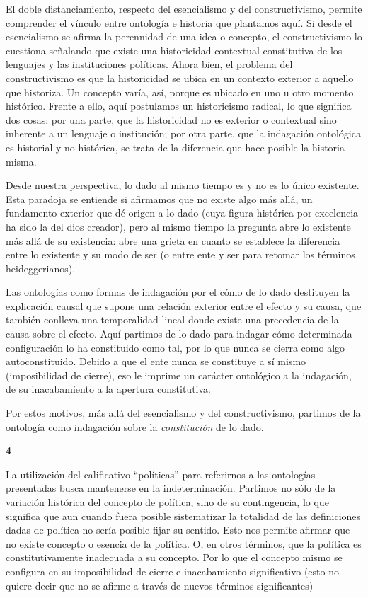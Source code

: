 El doble distanciamiento, respecto del esencialismo y del constructivismo, permite comprender el vínculo entre ontología e historia que plantamos aquí. Si desde el esencialismo se afirma la perennidad de una idea o concepto, el constructivismo lo cuestiona señalando que existe una historicidad contextual constitutiva de los lenguajes y las instituciones políticas. Ahora bien, el problema del constructivismo es que la historicidad se ubica en un contexto exterior a aquello que historiza. Un concepto varía, así, porque es ubicado en uno u otro momento histórico. Frente a ello, aquí postulamos un historicismo radical, lo que significa dos cosas: por una parte, que la historicidad no es exterior o contextual sino inherente a un lenguaje o institución; por otra parte, que la indagación ontológica es historial y no histórica, se trata de la diferencia que hace posible la historia misma.

Desde nuestra perspectiva, lo dado al mismo tiempo es y no es lo único existente. Esta paradoja se entiende si afirmamos que no existe algo más allá, un fundamento exterior que dé origen a lo dado (cuya figura histórica por excelencia ha sido la del dios creador), pero al mismo tiempo la pregunta abre lo existente más allá de su existencia: abre una grieta en cuanto se establece la diferencia entre lo existente y su modo de ser (o entre ente y ser para retomar los términos heideggerianos).

Las ontologías como formas de indagación por el cómo de lo dado destituyen la explicación causal que supone una relación exterior entre el efecto y su causa, que también conlleva una temporalidad lineal donde existe una precedencia de la causa sobre el efecto. Aquí partimos de lo dado para indagar cómo determinada configuración lo ha constituido como tal, por lo que nunca se cierra como algo autoconstituido. Debido a que el ente nunca se constituye a sí mismo (imposibilidad de cierre), eso le imprime un carácter ontológico a la indagación, de su inacabamiento a la apertura constitutiva.

Por estos motivos, más allá del esencialismo y del constructivismo, partimos de la ontología como indagación sobre la \emph{constitución} de lo dado.

\vspace{1em}
\noindent\textbf{4}

La utilización del calificativo \enquote{políticas} para referirnos a las ontologías presentadas busca mantenerse en la indeterminación. Partimos no sólo de la variación histórica del concepto de política, sino de su contingencia, lo que significa que aun cuando fuera posible sistematizar la totalidad de las definiciones dadas de política no sería posible fijar su sentido. Esto nos permite afirmar que no existe concepto o esencia de la política. O, en otros términos, que la política es constitutivamente inadecuada a su concepto. Por lo que el concepto mismo se configura en su imposibilidad de cierre e inacabamiento significativo (esto no quiere decir que no se afirme a través de nuevos términos significantes)

